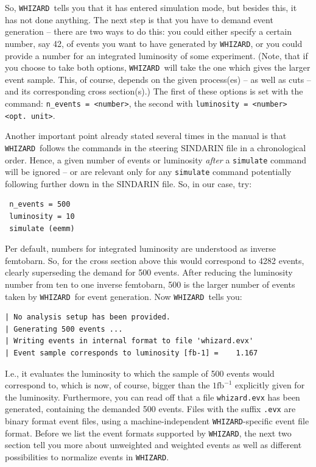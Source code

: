 \documentclass[12pt]{book}
\newcommand{\ttt}[1]{\texttt{#1}}
\newcommand{\whizard}{\texttt{WHIZARD}}
\newcommand{\fb}{\textrm{fb}}
\begin{document}
So, \whizard\ tells you that it has entered simulation mode, but besides
this, it has not done anything. The next step is that you have to
demand event generation -- there are two ways to do this: you could
either specify a certain number, say 42, of events you want to have
generated by \whizard, or you could provide a number for an integrated
luminosity of some experiment. (Note, that if you choose to take both
options, \whizard\ will take the one which gives the larger event
sample. This, of course, depends on the given process(es) -- as well
as cuts -- and its corresponding cross section(s).) The first of these
options is set with the command: \ttt{n\_events = <number>}, the
second with \ttt{luminosity = <number> <opt. unit>}.

Another important point already stated several times in the manual is
that \whizard\ follows the commands in the steering SINDARIN file in a
chronological order. Hence, a given number of events or luminosity
{\em after} a \ttt{simulate} command will be ignored -- or are
relevant only for any \ttt{simulate} command potentially following
further down in the SINDARIN file. So, in our case, try:
\begin{verbatim}
 n_events = 500
 luminosity = 10
 simulate (eemm)
\end{verbatim}
Per default, numbers for integrated luminosity are understood as
inverse femtobarn. So, for the cross section above this would
correspond to 4282 events, clearly superseding the demand for 500
events. After reducing the luminosity number from ten to one inverse
femtobarn, 500 is the larger number of events taken by \whizard\ for
event generation. Now \whizard\ tells you:
\begin{verbatim}
| No analysis setup has been provided.
| Generating 500 events ...
| Writing events in internal format to file 'whizard.evx'
| Event sample corresponds to luminosity [fb-1] =    1.167
\end{verbatim}
I.e., it evaluates the luminosity to which the sample of 500 events
would correspond to, which is now, of course, bigger than the $1
\fb^{-1}$ explicitly given for the luminosity. Furthermore, you can
read off that a file \ttt{whizard.evx} has been generated, containing
the demanded 500 events. Files with the suffix \ttt{.evx} are binary
format event files, using a machine-independent \whizard-specific
event file format. Before we list the event formats supported by
\whizard, the next two section tell you more about unweighted and
weighted events as well as different possibilities to normalize events
in \whizard.
\end{document}
